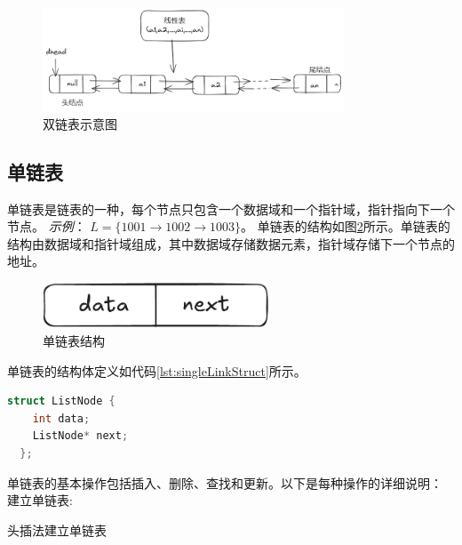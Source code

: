 \documentclass[lang=cn,newtx,10pt,scheme=chinese]{elegantbook}
\begin{document}
\begin{figure}[h]
  \centering
  \includegraphics[width=0.8\textwidth]{./image/doubleLink.png}
  \caption{双链表示意图}
  \label{fig:double_linked_list}
\end{figure}

\subsection{单链表}
单链表是链表的一种，每个节点只包含一个数据域和一个指针域，指针指向下一个节点。
\textit{示例}：
$L = \{1001 \rightarrow 1002 \rightarrow 1003\}$。
单链表的结构如图\ref{fig:singleLinkStruct}所示。单链表的结构由数据域和指针域组成，其中数据域存储数据元素，指针域存储下一个节点的地址。
\begin{figure}[h]
  \centering
  \includegraphics[width=0.6\textwidth]{./figure/pdf/cropped/singleStruct.pdf}
  \caption{单链表结构}
  \label{fig:singleLinkStruct}
\end{figure}
单链表的结构体定义如代码\ref{lst:singleLinkStruct}所示。
\begin{lstlisting}[language=C++, caption={单链表结构体定义}, label={lst:singleLinkStruct}]
  struct ListNode {
    int data;
    ListNode* next;
  };
\end{lstlisting}
单链表的基本操作包括插入、删除、查找和更新。以下是每种操作的详细说明：
建立单链表:

  头插法建立单链表
\end{document}
